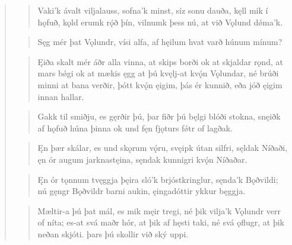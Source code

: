 \begin{verse}
\begin{verse}
\bva Vaki'k ávalt \hld viljalauss,
sofna'k minst, \hld síz sonu dauða,
kęll mik í hǫfuð, \hld kǫld erumk rǫ́ð þín,
vilnumk þess nú, \hld at við Vǫlund dǿma'k. \\%
\end{verse}


\begin{verse}
\bva Sęg mér þat Vǫlundr, \hld vísi alfa,
af hęilum hvat varð \hld húnum mínum? \\%
\end{verse}


\begin{verse}
\bva Ęiða skalt mér áðr \hld alla vinna,
at skips borði \hld ok at skjaldar rǫnd,
at mars bǿgi \hld ok at mækis ęgg
at þú kvęlj-at \hld kvǫ́n Vǫlundar,
né brúði minni \hld at bana verðir,
þótt kvǫ́n ęigim, \hld þás ér kunnið,
eða jóð ęigim \hld innan hallar. \\%
\end{verse}


\begin{verse}
\bva Gakk til smiðju, \hld es gęrðir þú,
þar fiðr þú bęlgi \hld blóði stokna,
snęiðk af hǫfuð \hld húna þinna
ok und fęn fjǫturs \hld fǿtr of lagðak. \\%
\end{verse}


\begin{verse}
\bva Ęn þær skálar, \hld es und skǫrum vǫ́ru,
svęipk útan silfri, \hld sęldak Níðaði,
ęn ór augum \hld jarknastęina,
sęndak kunnigri \hld kvǫ́n Níðaðar. \\%
\end{verse}


\begin{verse}
\bva Ęn ór tǫnnum \hld tvęggja þęira
sló'k brjóstkringlur, \hld sęnda'k Bǫðvildi;
nú gęngr Bǫðvildr \hld barni aukin,
ęingadóttir \hld ykkur bęggja. \\%
\end{verse}


\begin{verse}
\bva Mæltir-a þú þat mál, \hld es mik męir tregi,
né þik vilja'k Vǫlundr \hld verr of níta;
es-at svá maðr hór, \hld at þik af hęsti taki,
né svá ǫflugr, \hld at þik neðan skjóti.
þars þú skollir \hld við ský uppi. \\%
\end{verse}


\end{verse}
